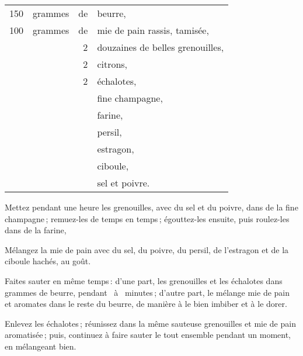 \setlength\tabcolsep{.15em}
\footnotesize
\begin{longtable}{rrrp{16em}}
  150 & grammes   & de & beurre,                                                                          \\
  100 & grammes   & de & mie de pain rassis, tamisée,                                                     \\
      &           &  2 & douzaines de belles grenouilles,                                                 \\
      &           &  2 & citrons,                                                                         \\
      &           &  2 & échalotes,                                                                       \\
      &           &    & fine champagne,                                                                  \\
      &           &    & farine,                                                                          \\
      &           &    & persil,                                                                          \\
      &           &    & estragon,                                                                        \\
      &           &    & ciboule,                                                                         \\
      &           &    & sel et poivre.                                                                   \\
\end{longtable}
\normalsize

Mettez pendant une heure les grenouilles, avec du sel et du poivre, dans de la
fine champagne ; remuez-les de temps en temps ; égouttez-les ensuite, puis
roulez-les dans de la farine,

Mélangez la mie de pain avec du sel, du poivre, du persil, de l’estragon et de la
ciboule hachés, au goût.

Faites sauter en même temps : d'une part, les grenouilles et les échalotes dans
{\mmm} grammes de beurre, pendant {\mmm} à {\mmm} minutes ;
d'autre part, le mélange mie de pain et aromates dans le reste du beurre, de
manière à le bien imbiber et à le dorer.

Enlevez les échalotes ; réunissez dans la même sauteuse grenouilles et mie de
pain aromatisée ; puis, continuez à faire sauter le tout ensemble pendant un
moment, en mélangeant bien.

